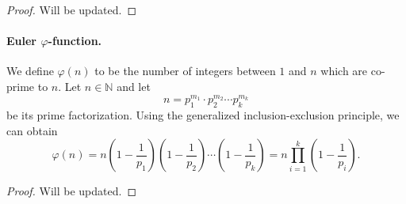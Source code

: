 \documentclass[14pt,english,oneside]{scrbook}
\numberwithin{equation}{chapter}
\theoremstyle{definition}
\theoremstyle{plain}
\begin{document}
\begin{proof}
  Will be updated.
\end{proof}

\paragraph{Euler $\varphi$-function.}

We define $\varphi (n)$ to be the number of integers between $1$ and $n$ which are co-prime to $n$. Let $n\in \mathbb{N}$ and let
\[
  n = p_1^{m_1}\cdot p_2^{m_2}\cdots p_k^{m_k}
\]
be its prime factorization. Using the generalized inclusion-exclusion principle, we can obtain
\begin{equation}
  \varphi(n) = n\left(1-\frac{1}{p_1}\right)\left(1-\frac{1}{p_2}\right)\cdots \left(1-\frac{1}{p_k}\right) = n\prod _{i=1}^k \left(1-\frac{1}{p_i}\right).
\end{equation}

\begin{proof}
  Will be updated.
\end{proof}
\end{document}
